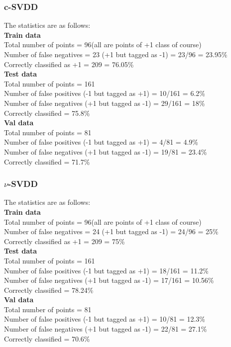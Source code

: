 \documentclass{article}
\begin{document}
\subsubsection{c-SVDD} 
The statistics are as follows:\\[5pt]
\textbf{Train data\\}
Total number of points = 96(all are points of +1 class of course) \\
Number of false negatives = 23 (+1 but tagged as -1) = 23/96 = 23.95\% \\  
Correctly classified as +1 = 209 = 76.05\%\\[10pt]
\textbf{Test data\\}
Total number of points = 161 \\
Number of false positives (-1 but tagged as +1) = 10/161 = 6.2\%\\ 
Number of false negatives (+1 but tagged as -1) = 29/161 = 18\% \\  
Correctly classified = 75.8\%\\[10pt]
\textbf{Val data\\}
Total number of points = 81 \\
Number of false positives (-1 but tagged as +1) = 4/81 = 4.9\%\\ 
Number of false negatives (+1 but tagged as -1) = 19/81 = 23.4\% \\  
Correctly classified = 71.7\%\\[10pt]

\subsubsection{$\nu$-SVDD} 
The statistics are as follows:\\[5pt]
\textbf{Train data\\}
Total number of points = 96(all are points of +1 class of course) \\
Number of false negatives = 24 (+1 but tagged as -1) = 24/96 = 25\% \\  
Correctly classified as +1 = 209 = 75\%\\[10pt]
\textbf{Test data\\}
Total number of points = 161 \\
Number of false positives (-1 but tagged as +1) = 18/161 = 11.2\%\\ 
Number of false negatives (+1 but tagged as -1) = 17/161 = 10.56\% \\  
Correctly classified = 78.24\%\\[10pt]
\textbf{Val data\\}
Total number of points = 81 \\
Number of false positives (-1 but tagged as +1) = 10/81 = 12.3\%\\ 
Number of false negatives (+1 but tagged as -1) = 22/81 = 27.1\% \\  
Correctly classified = 70.6\%\\[10pt]
\end{document}
